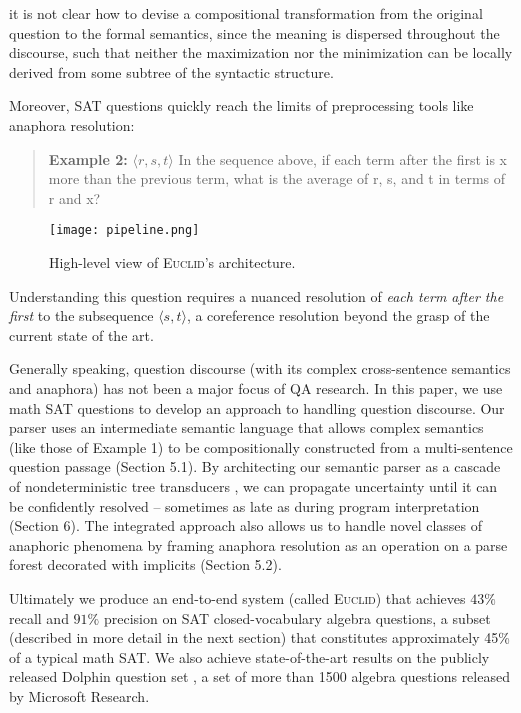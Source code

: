 \documentclass[11pt,letterpaper]{article}
\begin{document}
\noindent it is not clear how to devise a compositional transformation from the original question to the formal semantics, since the meaning is dispersed throughout the discourse, such that neither the maximization nor the minimization can be locally derived from some subtree of the syntactic structure. 

Moreover, SAT questions quickly reach the limits of preprocessing tools like anaphora resolution:

\begin{quote}
\textbf{Example 2:} $\langle r, s, t \rangle$ In the sequence above, if each term after the first is x more than the previous term, what is the average of r, s, and t in terms of r and x?	
\end{quote}

\begin{figure*}[tb]
\centering
\mbox{\texttt{[image: pipeline.png]}}
\caption{\label{fig:pipeline} High-level view of \textsc{Euclid}'s architecture.}
\end{figure*}


\noindent Understanding this question requires a nuanced resolution of \emph{each term after the first} to the subsequence $\langle s, t \rangle$, a coreference resolution beyond the grasp of the current state of the art.

Generally speaking, question discourse (with its complex cross-sentence semantics and anaphora) has not been a major focus of QA research.  In this paper, we use math SAT questions to develop an approach to handling question discourse. Our parser uses an intermediate semantic language that allows complex semantics (like those of Example 1) to be compositionally constructed from a multi-sentence question passage (Section 5.1). By architecting our semantic parser as a cascade of nondeterministic tree transducers \cite{gecseg1997tree}, we can propagate uncertainty until it can be confidently resolved -- sometimes as late as during program interpretation (Section 6). The integrated approach also allows us to handle novel classes of anaphoric phenomena by framing anaphora resolution as an operation on a parse forest decorated with implicits (Section 5.2). 




Ultimately we produce an end-to-end system (called \textsc{Euclid}) that achieves $43\%$ recall and $91\%$ precision on SAT closed-vocabulary algebra questions, a subset (described in more detail in the next section) that constitutes approximately 45\% of a typical math SAT. We also achieve state-of-the-art results on the publicly released Dolphin question set \cite{Shi2015AutomaticallySN}, a set of more than 1500 algebra questions released by Microsoft Research.
\end{document}
